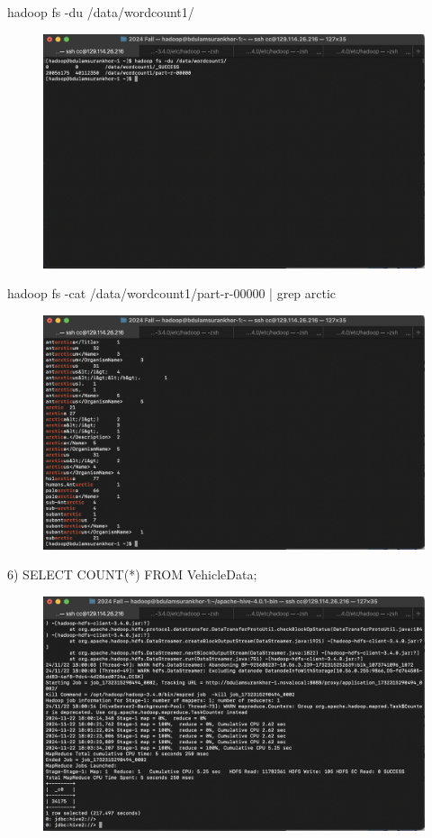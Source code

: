 \documentclass{article}
\begin{document}
hadoop fs -du /data/wordcount1/

\begin{figure}[H]
  \centering
  \includegraphics[width=\textwidth]{image5.png}
\end{figure}

hadoop fs -cat /data/wordcount1/part-r-00000 | grep arctic

\begin{figure}[H]
  \centering
  \includegraphics[width=\textwidth]{image6.png}
\end{figure}

6) SELECT COUNT(*) FROM VehicleData;

\begin{figure}[H]
  \centering
  \includegraphics[width=\textwidth]{image8.png}
\end{figure}
\end{document}
